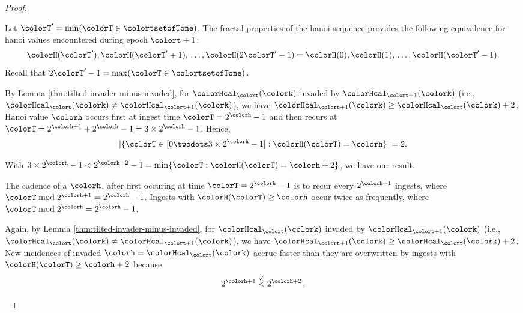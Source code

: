 \begin{proof}
\begin{proofpart}
Let $\colorT' = \min(\colorT \in \colortsetofTone)$.
The fractal properties of the hanoi sequence provides the following equivalence for hanoi values encountered during epoch $\colort + 1$:
\begin{align*}
\colorH(\colorT'), \colorH(\colorT'+1), \,\ldots, \colorH(2\colorT' - 1) = \colorH(0), \colorH(1), \,\ldots, \colorH(\colorT' - 1).
\end{align*}
Recall that $2\colorT' - 1 = \max(\colorT \in \colortsetofTone)$.

By Lemma \ref{thm:tilted-invader-minus-invaded}, for \hv{} $\colorHcal_{\colort}(\colork)$ invaded by \hv{} $\colorHcal_{\colort + 1}(\colork)$ (i.e., $\colorHcal_{\colort}(\colork) \neq \colorHcal_{\colort + 1}(\colork)$), we have $\colorHcal_{\colort + 1}(\colork) \geq \colorHcal_{\colort}(\colork) + 2$.
Hanoi value $\colorh$ occurs first at ingest time $\colorT = 2^{\colorh} - 1$ and then recurs at $\colorT = 2^{\colorh + 1} + 2^{\colorh} - 1 = 3 \times 2^{\colorh} - 1$.
Hence,
\begin{align*}
|\{\colorT \in [0 \twodots 3 \times 2^{\colorh} - 1] : \colorH(\colorT) = \colorh\}| = 2.
\end{align*}
\end{proofpart}
With $3 \times 2^{\colorh} - 1 < 2^{\colorh + 2} - 1 = \min\{\colorT : \colorH(\colorT) = \colorh + 2\}$, we have our result.

\begin{proofpart}
The cadence of a \hv{} $\colorh$, after first occuring at time $\colorT=2^{\colorh} - 1$ is to recur every $2^{\colorh + 1}$ ingests, where $\colorT \bmod 2^{\colorh + 1} = 2^{\colorh} - 1$.
Ingests with \hv{} $\colorH(\colorT) \geq \colorh$ occur twice as frequently, where $\colorT \bmod 2^{\colorh} = 2^{\colorh} - 1$.

Again, by Lemma \ref{thm:tilted-invader-minus-invaded}, for \hv{} $\colorHcal_{\colort}(\colork)$ invaded by \hv{} $\colorHcal_{\colort + 1}(\colork)$ (i.e., $\colorHcal_{\colort}(\colork) \neq \colorHcal_{\colort + 1}(\colork)$), we have $\colorHcal_{\colort + 1}(\colork) \geq \colorHcal_{\colort}(\colork) + 2$.
New incidences of invaded \hv{} $\colorh = \colorHcal_{\colort}(\colork)$ accrue faster than they are overwritten by ingests with $\colorH(\colorT) \geq \colorh + 2$ because
\begin{align*}
2^{\colorh + 1} \stackrel{\checkmark}{<} 2^{\colorh + 2}.
\end{align*}
\end{proofpart}

\end{proof}
